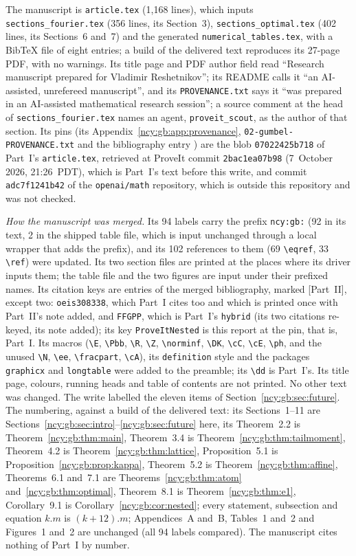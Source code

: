 \documentclass[11pt,letterpaper]{article}
\numberwithin{equation}{section}
\theoremstyle{remark}\newtheorem{remark}[theorem]{Remark}
\newcommand{\dd}{\,\mathrm d}
\newcommand{\file}[1]{\nolinkurl{#1}}
\theoremstyle{definition}\newtheorem{definition}[theorem]{Definition}\theoremstyle{plain}
\newcommand{\E}{\mathbb E}
\newcommand{\Pbb}{\mathbb P}
\newcommand{\R}{\mathbb R}
\newcommand{\Z}{\mathbb Z}
\newcommand{\N}{\mathbb N}
\newcommand{\norminf}[1]{\left\lVert #1\right\rVert_\infty}
\newcommand{\DK}{d_{\mathrm K}}
\newcommand{\ee}{\mathrm e}
\newcommand{\fracpart}[1]{\left\{#1\right\}}
\newcommand{\ph}{\varphi}
\newcommand{\cA}{\mathcal A}
\newcommand{\cC}{\mathcal C}
\newcommand{\cE}{\mathcal E}
\begin{document}
The manuscript is \file{article.tex} (1{,}168 lines), which inputs
\file{sections_fourier.tex} (356 lines, its Section~3),
\file{sections_optimal.tex} (402 lines, its Sections~6 and~7) and the
generated \file{numerical_tables.tex}, with a BibTeX file of eight entries; a
build of the delivered text reproduces its 27-page PDF, with no warnings.
Its title page and PDF author field read ``Research manuscript prepared for
Vladimir Reshetnikov''; its README calls it ``an AI-assisted, unrefereed
manuscript'', and its \file{PROVENANCE.txt} says it ``was prepared in an
AI-assisted mathematical research session''; a source comment at the head of
\file{sections_fourier.tex} names an agent, \texttt{proveit\_scout}, as the
author of that section. Its pins (its Appendix~\ref{ncy:gb:app:provenance},
\file{02-gumbel-PROVENANCE.txt} and the bibliography entry
\cite{ProveItNested}) are the blob \file{07022425b718} of Part~I's
\file{article.tex}, retrieved at ProveIt commit \file{2bac1ea07b98}
(7~October 2026, 21:26~PDT), which is Part~I's text before this write, and
commit \file{adc7f1241b42} of the \texttt{openai/math} repository, which is
outside this repository and was not checked.

\emph{How the manuscript was merged.} Its 94 labels carry the prefix
\file{ncy:gb:} (92 in its text, 2 in the shipped table file, which is input
unchanged through a local wrapper that adds the prefix), and its 102
references to them (69 \verb|\eqref|, 33 \verb|\ref|) were updated. Its two
section files are printed at the places where its driver inputs them; the
table file and the two figures are input under their prefixed names. Its
citation keys are entries of the merged bibliography, marked [Part~II],
except two: \file{oeis308338}, which Part~I cites too and which is printed
once with Part~II's note added, and \file{FFGPP}, which is Part~I's
\file{hybrid} (its two citations re-keyed, its note added); its key
\file{ProveItNested} is this report at the pin, that is, Part~I. Its macros
(\verb|\E|, \verb|\Pbb|, \verb|\R|, \verb|\Z|, \verb|\norminf|, \verb|\DK|,
\verb|\cC|, \verb|\cE|, \verb|\ph|, and the unused \verb|\N|, \verb|\ee|,
\verb|\fracpart|, \verb|\cA|), its \texttt{definition} style and the packages
\texttt{graphicx} and \texttt{longtable} were added to the preamble; its
\verb|\dd| is Part~I's. Its title page, colours, running heads and table of
contents are not printed. No other text was changed. The write labelled the
eleven items of Section~\ref{ncy:gb:sec:future}. The numbering, against a
build of the delivered text: its Sections~1--11 are
Sections~\ref{ncy:gb:sec:intro}--\ref{ncy:gb:sec:future} here, its
Theorem~2.2 is Theorem~\ref{ncy:gb:thm:main}, Theorem~3.4 is
Theorem~\ref{ncy:gb:thm:tailmoment}, Theorem~4.2 is
Theorem~\ref{ncy:gb:thm:lattice}, Proposition~5.1 is
Proposition~\ref{ncy:gb:prop:kappa}, Theorem~5.2 is
Theorem~\ref{ncy:gb:thm:affine}, Theorems~6.1 and~7.1 are
Theorems~\ref{ncy:gb:thm:atom} and~\ref{ncy:gb:thm:optimal}, Theorem~8.1 is
Theorem~\ref{ncy:gb:thm:e1}, Corollary~9.1 is
Corollary~\ref{ncy:gb:cor:nested}; every statement, subsection and equation
$k.m$ is $(k{+}12).m$; Appendices~A and~B, Tables~1 and~2 and Figures~1
and~2 are unchanged (all 94 labels compared). The manuscript cites nothing of
Part~I by number.
\end{document}
